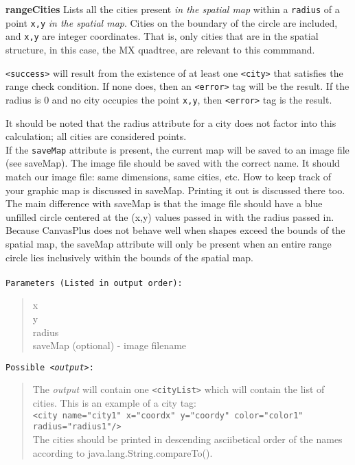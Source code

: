 \documentclass[12pt]{article}
\newenvironment{Description}
   {\begin{list}{}{\let\makelabel\Descriptionlabel
      \setlength\leftmargin{\labelwidth+\labelsep}
      \setlength\itemindent{-0.3em}}}%
   {\end{list}}
\newcommand*{\Descriptionlabel}[1]{%
  \parbox[b]{\labelwidth}
  {\makebox[0pt][l]{\textbf{#1}}\\}
  \hfill}
\begin{document}
\begin{Description}
\begin{Description}
	\item[\textbf{rangeCities}]
	Lists all the cities present \emph{in the spatial  map} within a
	\texttt{radius} of a point \texttt{x,y} \emph{in the spatial  map}.
        Cities on the boundary of the circle are included, and
	\texttt{x,y} are integer coordinates. That is, only cities
	that are in the spatial structure, in this case, the MX
	quadtree, are relevant to this  commmand.

	\texttt{<success>} will result from the existence of at least
        one \texttt{<city>} that satisfies  the range check
        condition.   
	If none does, then an \texttt{<error>} tag will be the
        result. 
        If the radius is 0 and no   city occupies  the point
        \texttt{x,y}, then  \texttt{<error>} tag is the result.


	It should be noted that the radius attribute for a city does not factor into this calculation; all cities are considered points.\\
	If the \texttt{saveMap} attribute is present, the current map will be saved to an image file (see saveMap).
	The image file should be saved with the correct name. It should match our image file: same dimensions, same cities, etc.
	How to keep track of your graphic map is discussed in saveMap. Printing it out is discussed there too. 
	The main difference with saveMap is that the image file should have a blue unfilled circle centered at the (x,y) values passed in with the radius passed in. 
	Because CanvasPlus does not behave well when shapes exceed the bounds of the spatial map, the saveMap attribute will only be present when an entire 
	range circle lies inclusively within the bounds of the spatial map.\\\\
	 \texttt{Parameters (Listed in output order):}
	\begin{quote}
		x\\
		y\\
		radius\\
		saveMap (optional) - image filename
	\end{quote}
	\texttt{Possible \emph{<output>}:}
	\begin{quote}
		The \emph{output} will contain one \texttt{<cityList>} which will contain the list of cities. This is an example of a city tag:\\
		\texttt{<city name="city1" x="coordx" y="coordy" color="color1" radius="radius1"/>}\\
		The cities should be printed in descending asciibetical order of the names according to
		java.lang.String.compareTo().
	\end{quote}


\end{Description}
\end{Description}
\end{document}
